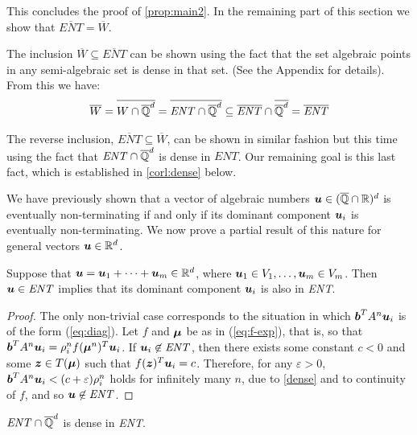 This concludes the proof of \cref{prop:main2}.
In the remaining part of this section we show that
$\overline{\mathit{ENT}}=\overline{W}$.

The inclusion $\overline{W}\subseteq \overline{ENT}$ can be shown
using the fact that the set algebraic points in any semi-algebraic set
is dense in that set. (See the Appendix for details).  From
this we have:
\begin{align*}
\overline{W}=\overline{W\cap\overline{\mathbb{Q}}^d}=\overline{\mathit{ENT}\cap\overline{\mathbb{Q}}^d} \subseteq \overline{\mathit{ENT}}\cap\overline{\overline{\mathbb{Q}}^d}=\overline{\mathit{ENT}}
\end{align*}

The reverse inclusion, $\overline{ENT}\subseteq\overline{W}$, can be
shown in similar fashion but this time using the fact that
$\mathit{ENT}\cap\overline{\mathbb{Q}}^d$ is dense in $\mathit{ENT}$.  Our
remaining goal is this last fact, which is established in
\cref{corl:dense} below.

We have previously shown that a vector of algebraic numbers
$\boldsymbol{u}\in (\overline{\mathbb{Q}}\cap\mathbb{R})^d$ is eventually
non-terminating if and only if its dominant component
$\boldsymbol{u}_i$ is eventually non-terminating.  We now prove a
partial result of this nature for general vectors $\boldsymbol{u}\in
\mathbb{R}^d$.

\begin{proposition}
  Suppose that $\boldsymbol u=\boldsymbol u_1+\cdots+\boldsymbol
  u_m\in \mathbb{R}^d$, where $\boldsymbol u_1\in
  V_1,\ldots,\boldsymbol u_m\in V_m$. Then $\boldsymbol
  u\in\mathit{ENT}$ implies that its dominant component $\boldsymbol
  u_i$ is also in \textit{ENT}.
\label{prop:dom2}
\end{proposition}
\begin{proof}
  The only non-trivial case corresponds to the situation in which
  $\boldsymbol b^T A^n \boldsymbol u_i$ is of the form (\ref{eq:diag}).
  Let $f$ and $\boldsymbol \mu$ be as in (\ref{eq:f-exp}), that is, so
  that $\boldsymbol b^T A^n \boldsymbol u_i=\rho_i^n f (\boldsymbol
  \mu^n)^T \boldsymbol u_i$. If $\boldsymbol u_i\not\in\mathit{ENT}$,
  then there exists some constant $c<0$ and some $\boldsymbol z\in T(\boldsymbol \mu)$ such that $f(\boldsymbol z)^T \boldsymbol u_i=c$. Therefore, for any $\varepsilon>0$, $\boldsymbol b^T A^n \boldsymbol u_i<(c+\varepsilon)\rho_i^n$ holds for infinitely many $n$, due to \cref{dense} and to continuity of $f$, and so $\boldsymbol u\not\in\mathit{ENT}$.
\end{proof}

\begin{corollary}
$\mathit{ENT}\cap\overline{\mathbb{Q}}^d$ is dense in \textit{ENT}.
\label{corl:dense}
\end{corollary}

